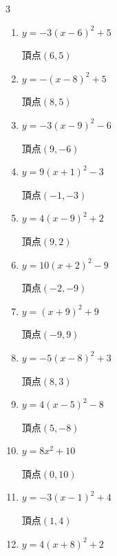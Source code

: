 \begin{multicols}{3}
\begin{enumerate}
  \item $\displaystyle y=-3\left( x-6\right)^{2}+5$

        $\displaystyle 頂点\left( 6 , 5 \right)$

  \item $\displaystyle y=-\left( x-8\right)^{2}+5$

        $\displaystyle 頂点\left( 8 , 5 \right)$

\columnbreak %

  \item $\displaystyle y=-3\left( x-9\right)^{2}-6$

        $\displaystyle 頂点\left( 9 , -6 \right)$

  \item $\displaystyle y=9\left( x+1\right)^{2}-3$

        $\displaystyle 頂点\left( -1 , -3 \right)$

  \item $\displaystyle y=4\left( x-9\right)^{2}+2$

        $\displaystyle 頂点\left( 9 , 2 \right)$

  \item $\displaystyle y=10\left( x+2\right)^{2}-9$

        $\displaystyle 頂点\left( -2 , -9 \right)$

  \item $\displaystyle y=\left( x+9\right)^{2}+9$

        $\displaystyle 頂点\left( -9 , 9 \right)$

  \item $\displaystyle y=-5\left( x-8\right)^{2}+3$

        $\displaystyle 頂点\left( 8 , 3 \right)$

  \item $\displaystyle y=4\left( x-5\right)^{2}-8$

        $\displaystyle 頂点\left( 5 , -8 \right)$

  \item $\displaystyle y=8x^{2}+10$

        $\displaystyle 頂点\left( 0 , 10 \right)$

  \item $\displaystyle y=-3\left( x-1\right)^{2}+4$

        $\displaystyle 頂点\left( 1 , 4 \right)$

  \item $\displaystyle y=4\left( x+8\right)^{2}+2$


\end{enumerate}
\end{multicols}
